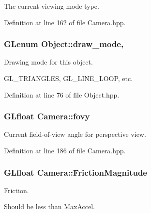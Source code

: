 The current viewing mode type. 



Definition at line 162 of file Camera.\-hpp.

\hypertarget{class_object_a82764b385767d989f27d301ab206acb8}{
\subsubsection[{draw\-\_\-mode}]{\setlength{\rightskip}{0pt plus 5cm}G\-Lenum Object\-::draw\-\_\-mode\hspace{0.3cm}{\ttfamily [protected]}, {\ttfamily [inherited]}}}\label{class_object_a82764b385767d989f27d301ab206acb8}


Drawing mode for this object. 

G\-L\-\_\-\-T\-R\-I\-A\-N\-G\-L\-E\-S, G\-L\-\_\-\-L\-I\-N\-E\-\_\-\-L\-O\-O\-P, etc. 

Definition at line 76 of file Object.\-hpp.

\hypertarget{class_camera_acc8b97facc57059530efad534c2f8314}{
\subsubsection[{fovy}]{\setlength{\rightskip}{0pt plus 5cm}G\-Lfloat Camera\-::fovy\hspace{0.3cm}{\ttfamily [private]}}}\label{class_camera_acc8b97facc57059530efad534c2f8314}


Current field-\/of-\/view angle for perspective view. 



Definition at line 186 of file Camera.\-hpp.

\hypertarget{class_camera_a4260507a4e59b2b079a0e1c6a5b64d5c}{
\subsubsection[{Friction\-Magnitude}]{\setlength{\rightskip}{0pt plus 5cm}G\-Lfloat Camera\-::\-Friction\-Magnitude\hspace{0.3cm}{\ttfamily [private]}}}\label{class_camera_a4260507a4e59b2b079a0e1c6a5b64d5c}


Friction. 

Should be less than Max\-Accel. 

